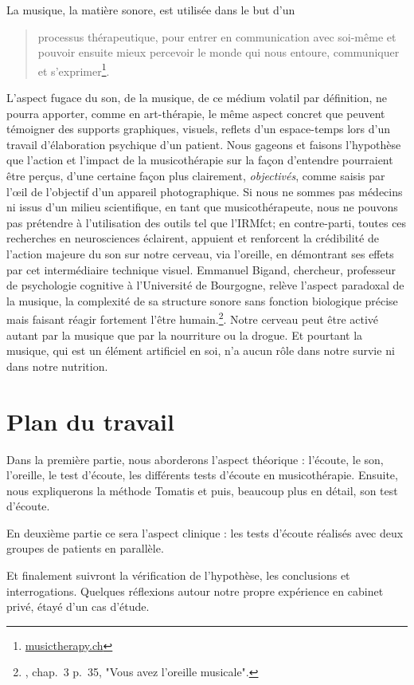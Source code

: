 La musique, la matière sonore, est utilisée dans le but d'un 
\begin{quote}
	processus thérapeutique, pour entrer en communication avec soi-même et pouvoir ensuite mieux percevoir le monde qui nous
	entoure, communiquer et s'exprimer\footnote{%
		\href{http://www.musictherapy.ch/fr/musicotherapie/quest-ce-que-la-musicotherapie/}{musictherapy.ch}}.
\end{quote}


L'aspect fugace du son, de la musique, de ce médium volatil par
définition, ne pourra apporter, comme en art-thérapie, le
même aspect concret que peuvent témoigner des supports graphiques,
visuels, reflets d'un espace-temps lors d'un travail d'élaboration
psychique d'un patient. Nous gageons et faisons l'hypothèse que l'action et l'impact de la
musicothérapie sur la façon d'entendre pourraient être perçus, d'une certaine façon plus
clairement, \textsl{ objectivés}, comme saisis par l'\oe il de l'objectif d'un appareil
photographique.
Si nous ne sommes pas médecins ni issus d'un milieu scientifique, en tant que musicothérapeute, nous ne pouvons pas prétendre à l'utilisation des outils
 tel que l'IRMfct; en contre-parti, toutes ces recherches en
neurosciences éclairent, appuient et renforcent la crédibilité de l'action
majeure du son sur notre cerveau, via l'oreille, en démontrant ses effets par cet intermédiaire technique visuel.  Emmanuel Bigand, chercheur, professeur de
psychologie cognitive à l'Université de Bourgogne, relève l'aspect
paradoxal de la musique, la complexité de sa structure sonore sans
fonction biologique précise mais faisant réagir fortement l'être
humain.\footnote{\cite{AuteurInconnu2011}, chap.~3 p.~35, "Vous avez l'oreille musicale".}.  Notre cerveau peut être activé autant par
la musique que par la nourriture ou la drogue. Et pourtant la musique,
qui est un élément artificiel en soi, n'a aucun rôle dans notre survie ni dans
notre nutrition.


\section{Plan du travail}

Dans la première partie, nous aborderons l'aspect théorique : l'écoute, le son, l'oreille, le test d'écoute, les différents tests d'écoute en musicothérapie.  Ensuite, nous expliquerons  la méthode Tomatis
et puis, beaucoup plus en détail, son test d'écoute.

En deuxième partie ce sera l'aspect clinique : les tests d'écoute réalisés  avec deux groupes de patients en parallèle.

Et finalement suivront la vérification de l'hypothèse, les conclusions et interrogations. 
Quelques réflexions autour notre propre expérience en cabinet privé, étayé d'un cas d'étude.
